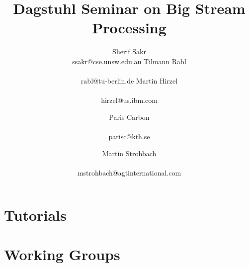\documentclass[preprint]{sig-alternate-10pt}
\begin{document}
\title{Dagstuhl Seminar on Big Stream Processing}

\newcommand*{\emailn}[1]{\textsf{\normalsize #1}}

\author{
\alignauthor
Sherif Sakr\\
  \emailn{ssakr@cse.unsw.edu.au}
\alignauthor
Tilmann Rabl\\
  \\
  \emailn{rabl@tu-berlin.de}
\alignauthor
Martin Hirzel\\
  \\
  \emailn{hirzel@us.ibm.com}
\and
\alignauthor
Paris Carbon\\
  \\
  \emailn{parisc@kth.se}
\and
\alignauthor
Martin Strohbach\\
  \\
  \emailn{mstrohbach@agtinternational.com}}


\maketitle



\section{Tutorials}



\section{Working Groups}





\balance

\end{document}
